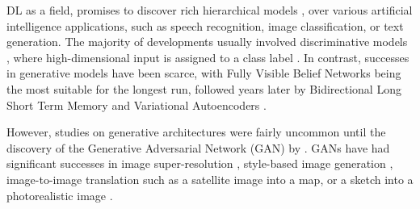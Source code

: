 DL as a field, promises to discover rich hierarchical models \parencite{lecun_deep_2015}, over various artificial intelligence applications, such as speech recognition, image classification, or text generation. The majority of developments usually involved discriminative models \parencite{goodfellow_generative_2014}, where high-dimensional input is assigned to a class label \parencite{zhang_character-level_2015, krizhevsky_imagenet_2012}. In contrast, successes in generative models have been scarce, with Fully Visible Belief Networks \parencite{frey_does_1996} being the most suitable for the longest run, followed years later by Bidirectional Long Short Term Memory \parencite{graves_generating_2013} and Variational Autoencoders \parencite{kingma_auto-encoding_2013}.

However, studies on generative architectures were fairly uncommon until the discovery of the Generative Adversarial Network (GAN) by \textcite{goodfellow_generative_2014}. GANs have had significant successes in image super-resolution \parencite[; see Figure \ref{fig:srgan}]{ledig_photo-realistic_2016}, style-based image generation \parencite{karras_style-based_2018}, image-to-image translation such as a satellite image into a map, or a sketch into a photorealistic image \parencite[;see Figure \ref{fig:pix2pix}]{isola_image--image_2016}.

